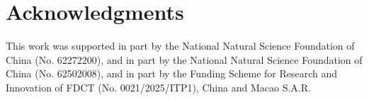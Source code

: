 \section*{Acknowledgments}
\label{sec:acknowledgments}

This work was supported in part by the National Natural Science Foundation of China (No. 62272200), and in part by the National Natural Science Foundation of China (No. 62502008), and in part by the Funding Scheme for Research and Innovation of FDCT (No. 0021/2025/ITP1), China and Macao S.A.R.